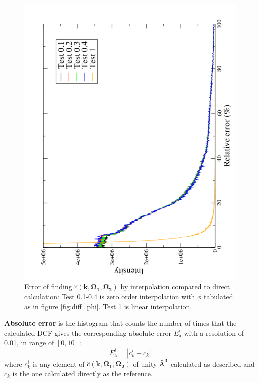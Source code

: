 \begin{figure}[h]
\begin{minipage}[t]{1.1\textwidth}
\begin{center}
\par\end{center}

\begin{center}
\includegraphics[angle=-90,scale=0.3]{_figure/c_local_to_global_coordinates_32_96/relative_error}
\par\end{center}

\caption[Error of finding $\hat{c}(\mathbf{k},\mathbf{\Omega_{1}},\mathbf{\Omega_{2}})$
by interpolation compared to direct calculation]{Error of finding $\hat{c}(\mathbf{k},\mathbf{\Omega_{1}},\mathbf{\Omega_{2}})$
by interpolation compared to direct calculation: Test 0.1-0.4 is zero
order interpolation with $\phi$ tabulated as in figure \ref{fig:diff_phi}.
Test 1 is linear interpolation.\label{fig:error}}
%
\end{minipage}
\end{figure}


\textbf{Absolute error} is the histogram that counts the number of
times that the calculated DCF gives the corresponding absolute error
$E_{\mathrm{a}}^{i}$ with a resolution of 0.01, in range of $[0,10]$:
\begin{equation}
E_{\mathrm{a}}^{i}=\left|c_{k}^{i}-c_{k}\right|
\end{equation}
where $c_{k}^{i}$ is any element of $\hat{c}(\mathbf{k},\mathbf{\Omega_{1}},\mathbf{\Omega_{2}})$
of unity $\lyxmathsym{\AA}^{3}$ calculated as described and $c_{k}$
is the one calculated directly as the reference.

